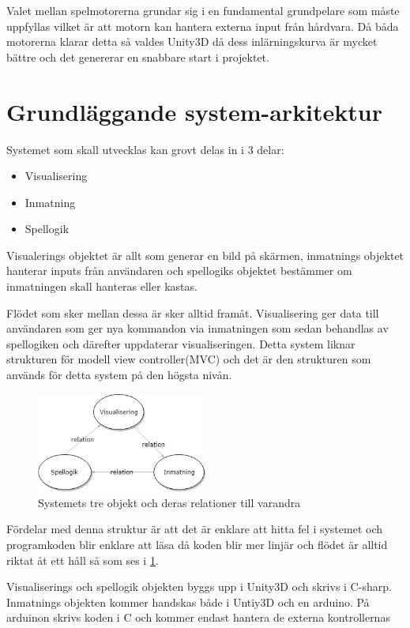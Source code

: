 \documentclass[a4paper,12pt,oneside,final]{extbook}
\begin{document}
 Valet mellan spelmotorerna grundar sig i en fundamental grundpelare som måste uppfyllas vilket är att motorn kan hantera externa input från hårdvara. Då båda motorerna klarar detta så valdes Unity3D då dess inlärningskurva är mycket bättre och det genererar en snabbare start i projektet.

\section{Grundläggande system-arkitektur}
Systemet som skall utvecklas kan grovt delas in i 3 delar:
\begin{itemize}
	\item Visualisering
	\item Inmatning
	\item Spellogik
\end{itemize}
Visualerings objektet är allt som generar en bild på skärmen, inmatnings objektet hanterar inputs från användaren och spellogiks objektet bestämmer om inmatningen skall hanteras eller kastas. 

Flödet som sker mellan dessa är sker alltid framåt. Visualisering ger data till användaren som ger nya kommandon via inmatningen som sedan behandlas av spellogiken och därefter uppdaterar visualiseringen. Detta system liknar strukturen för modell view controller(MVC)\cite{Design} och det är den strukturen som används för detta system på den högsta nivån. 

\begin{figure}[h]
	\includegraphics[width=0.5\textwidth, center]{System.jpg}
	\caption{Systemets tre objekt och deras relationer till varandra}
	\label{fig:System}
\end{figure}

Fördelar med denna struktur är att det är enklare att hitta fel i systemet och programkoden blir enklare att läsa då koden blir mer linjär och flödet är alltid riktat åt ett håll så som ses i \ref{fig:System}.

Visualiserings och spellogik objekten byggs upp i Unity3D och skrivs i C-sharp. Inmatnings objekten kommer handskas både i Untiy3D och en arduino. På arduinon skrivs koden i C och kommer endast hantera de externa kontrollernas  
\end{document}
